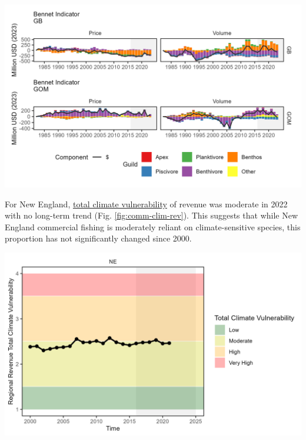 \documentclass[
  10pt,
]{article}
\let\origfigure\figure
\let\endorigfigure\endfigure
\renewenvironment{figure}[1][2] {
    \expandafter\origfigure\expandafter[H]
} {
    \endorigfigure
}
\begin{document}
\begin{figure}

{\centering \includegraphics[width=6.5in]{images/NewEngland/bennet_all_NewEngland_2025-09-09} 

}

\caption{Revenue change from the long-term mean in 2023 dollars (black), price, and volume for commercial landings from Georges Bank (GB: top panels) and the Gulf of Maine (GOM: bottom panels)}\label{fig:bennet-all-83}
\end{figure}

For New England, \href{https://noaa-edab.github.io/catalog/community_climate_vulnerability.html}{total climate vulnerability} of revenue was moderate in 2022 with no long-term trend (Fig. \ref{fig:comm-clim-rev}). This suggests that while New England commercial fishing is moderately reliant on climate-sensitive species, this proportion has not significantly changed since 2000.

\begin{figure}

{\centering \includegraphics[width=6.5in]{images/NewEngland/climatevul_rev_NewEngland_2025-09-09} 

}

\caption{Total climate vulnerability on New England revenue from 2000 to 2022. Horizontal colored bars show different climate risk levels.}\label{fig:comm-clim-rev}
\end{figure}
\end{document}
